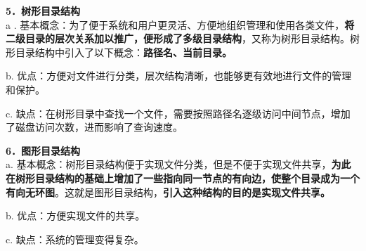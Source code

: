 \textbf{{5．树形目录结构}}\\

a .
基本概念：为了便于系统和用户更灵活、方便地组织管理和使用各类文件，\textbf{将二级目录的层次关系加以推广，便形成了多级目录结构}，又称为树形目录结构。{树形目录结构中引入了以下概念：}\textbf{路径名、当前目录。}

b.
优点：方便对文件进行分类，层次结构清晰，也能够更有效地进行文件的管理和保护。

c.
缺点：在树形目录中查找一个文件，需要按照路径名逐级访问中间节点，增加了磁盘访问次数，进而影响了查询速度。

\textbf{{6．图形目录结构}}\\

a.
基本概念：树形目录结构便于实现文件分类，但是不便于实现文件共享，\textbf{为此在树形目录结构的基础上增加了一些指向同一节点的有向边，使整个目录成为一个有向无环图}。这就是图形目录结构，\textbf{{引入这种结构的目的是实现文件共享。}}

b. 优点：方便实现文件的共享。

c. 缺点：系统的管理变得复杂。
